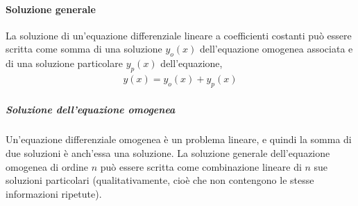 \documentclass[letterpaper,10pt,italian]{jupyterBook}
\begin{document}
\paragraph{Soluzione generale}
\label{\detokenize{ch/ode:soluzione-generale}}\label{\detokenize{ch/ode:ode-hs-types-linear-const-sol}}
\sphinxAtStartPar
La soluzione di un’equazione differenziale lineare a coefficienti costanti può essere scritta come somma di una soluzione \(y_o(x)\) dell’equazione omogenea associata e di una soluzione particolare \(y_p(x)\) dell’equazione,
\begin{equation*}
\begin{split}y(x) = y_o(x) + y_p(x)\end{split}
\end{equation*}

\subparagraph{Soluzione dell’equazione omogenea}
\label{\detokenize{ch/ode:soluzione-dell-equazione-omogenea}}\label{\detokenize{ch/ode:ode-hs-types-linear-const-sol-homo}}
\sphinxAtStartPar
Un’equazione differenziale omogenea è un problema lineare, e quindi la somma di due soluzioni è anch’essa una soluzione. La soluzione generale dell’equazione omogenea di ordine \(n\) può essere scritta come combinazione lineare di \(n\) sue soluzioni particolari  (qualitativamente, cioè che non contengono le stesse informazioni ripetute).
\end{document}
